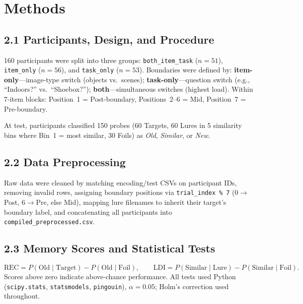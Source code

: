 \documentclass[10pt,a4paper]{article}
\begin{document}
\section{Methods}

\subsection*{2.1 Participants, Design, and Procedure}

160 participants were split into three groups: \texttt{both\_item\_task} ($n{=}51$), \texttt{item\_only} ($n{=}56$), and \texttt{task\_only} ($n{=}53$). Boundaries were defined by: \textbf{item-only}---image-type switch (objects vs.\ scenes); \textbf{task-only}---question switch (e.g., ``Indoors?'' vs.\ ``Shoebox?''); \textbf{both}---simultaneous switches (highest load). Within 7-item blocks: Position~1 = Post-boundary, Positions~2--6 = Mid, Position~7 = Pre-boundary.

At test, participants classified 150 probes (60 Targets, 60 Lures in 5 similarity bins where Bin~1 = most similar, 30 Foils) as \emph{Old}, \emph{Similar}, or \emph{New}.

\subsection*{2.2 Data Preprocessing}

Raw data were cleaned by matching encoding/test CSVs on participant IDs, removing invalid rows, assigning boundary positions via \texttt{trial\_index~\%~7} ($0{\to}$Post, $6{\to}$Pre, else Mid), mapping lure filenames to inherit their target's boundary label, and concatenating all participants into \texttt{compiled\_preprocessed.csv}.

\subsection*{2.3 Memory Scores and Statistical Tests}

\[
  \mathrm{REC} = P(\mathrm{Old}\mid\mathrm{Target}) - P(\mathrm{Old}\mid\mathrm{Foil}), \qquad
  \mathrm{LDI} = P(\mathrm{Similar}\mid\mathrm{Lure}) - P(\mathrm{Similar}\mid\mathrm{Foil}).
\]
Scores above zero indicate above-chance performance. All tests used Python (\texttt{scipy.stats}, \texttt{statsmodels}, \texttt{pingouin}), $\alpha = 0.05$; Holm's correction used throughout.

\end{document}
